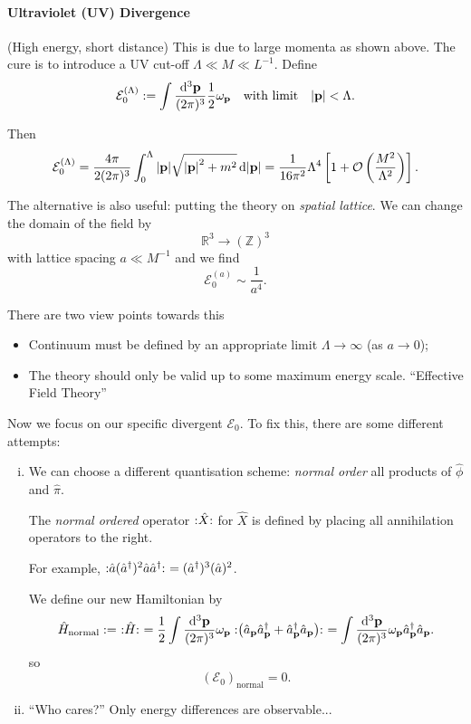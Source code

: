 \documentclass[a4paper,11pt]{article}
\begin{document}
	\paragraph{Ultraviolet (UV) Divergence} (High energy, short distance) This is due to large momenta as shown above. The cure is to introduce a UV cut-off $\Lambda \ll M \ll L^{-1}$. Define
	\[
		\mathcal{E}_0 ^{(\Lambda)} := \int \frac{\dd[3]{\vb p}}{(2\pi)^{3}} \frac{1}{2} \omega _{\vb p} \quad \text{with limit} \quad \abs{\vb p} < \Lambda.
	\]
	
	Then
	\[
		\mathcal{E}_0 ^{(\Lambda)} = \frac{4 \pi}{2 (2 \pi)^3} \int_{0}^{\Lambda} \abs{\vb p} \sqrt{\abs{\vb p}^2 + m^2} \dd{\abs{\vb p}} = \frac{1}{16 \pi^2} \Lambda^4 \left[ 1 + \mathcal{O} \left( \frac{M^2}{\Lambda^2} \right) \right].
	\]

	The alternative is also useful: putting the theory on \emph{spatial lattice}. We can change the domain of the field by
	\[
		\mathbb{R}^3 \to (\mathbb{Z})^3
	\]
	with lattice spacing $a \ll M^{-1}$ and we find
	\[
		\mathcal{E}_0 ^{(a)} \sim \frac{1}{a^4}.
	\]

	There are two view points towards this
	\begin{itemize}
		\item Continuum must be defined by an appropriate limit $\Lambda \to \infty$ (as $a \to 0$);
		\item The theory should only be valid up to some maximum energy scale. ``Effective Field Theory''
	\end{itemize}

	Now we focus on our specific divergent $\mathcal{E}_0$. To fix this, there are some different attempts: 
	\begin{enumerate}[i)]
		\item We can choose a different quantisation scheme: \emph{normal order} all products of $\hat \phi$ and $\hat \pi$. \begin{defi}
			The \emph{normal ordered} operator $:\mathrel{\hat X}:$ for $\hat X$ is defined by placing all annihilation operators to the right.
		\end{defi}
		For example, $:\mathrel{\hat a (\hat a^\dagger)^2 \hat a \hat a^\dagger}:\ = (\hat a^\dagger)^3 (\hat a)^2 $.
		
		We define our new Hamiltonian by
		\[
			\hat H _{\text{normal}} :=\ :\mathrel{\hat H}:\ = \frac{1}{2} \int \frac{\dd[3]{\vb p}}{(2\pi)^{3}} \omega _{\vb p} :\mathrel{\left( \hat a _{\vb p}\hat a^\dagger _{\vb p} + \hat a^\dagger _{\vb p} \hat a _{\vb p} \right)}:\ = \int \frac{\dd[3]{\vb p}}{(2\pi)^{3}} \omega _{\vb p} \hat a^\dagger _{\vb p} \hat a _{\vb p}.
		\]
		so
		\[
			(\mathcal{E}_0)_{\text{normal}} = 0.
		\]
		\item ``Who cares?'' Only energy differences are observable...
	\end{enumerate}
\end{document}
